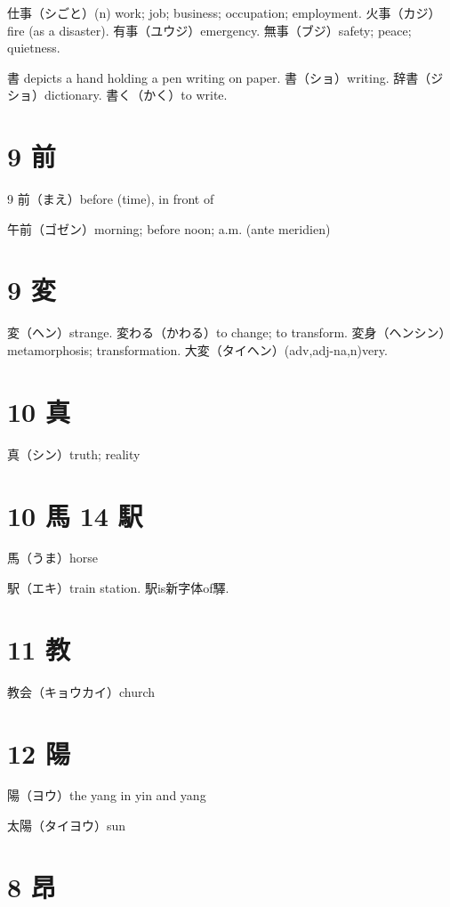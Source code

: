 仕事（シごと）(n) work; job; business; occupation; employment.
火事（カジ）fire (as a disaster).
有事（ユウジ）emergency.
無事（ブジ）safety; peace; quietness.

書 depicts a hand holding a pen writing on paper.
書（ショ）writing.
辞書（ジショ）dictionary.
書く（かく）to write.

\section{9 前}

9 前（まえ）before (time), in front of

午前（ゴゼン）morning; before noon; a.m. (ante meridien)

\section{9 変}

変（ヘン）strange.
変わる（かわる）to change; to transform.
変身（ヘンシン）metamorphosis; transformation.
大変（タイヘン）(adv,adj-na,n)very.

\section{10 真}

真（シン）truth; reality

\section{10 馬 14 駅}

馬（うま）horse

駅（エキ）train station. 駅is新字体of驛.

\section{11 教}

教会（キョウカイ）church

\section{12 陽}

陽（ヨウ）the yang in yin and yang

太陽（タイヨウ）sun

\section{8 昂}

